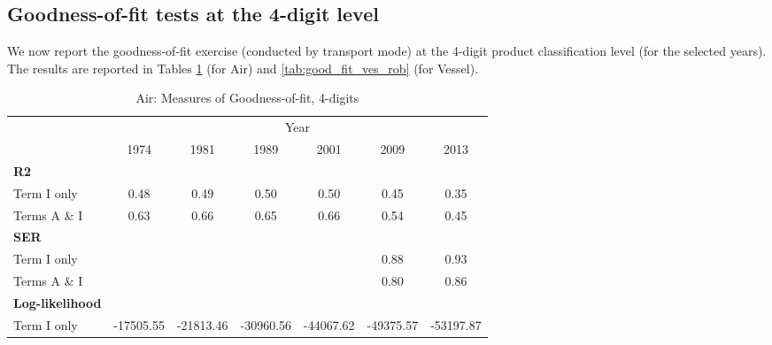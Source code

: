 \documentclass[a4paper,11pt]{article}
\begin{document}
\subsection{Goodness-of-fit tests at the 4-digit level}

We now report the goodness-of-fit exercise (conducted by transport mode) at the 4-digit product classification level (for the selected years). The results are reported in Tables \ref{tab:good_fit_air_rob} (for Air) and \ref{tab:good_fit_ves_rob} (for Vessel).
\begin{table}[htbp]
  \centering
  \caption{Air: Measures of Goodness-of-fit, 4-digits}
\begin{center}
\label{tab:good_fit_air_rob}%
\begin{tabular}{l|cccccc}
\hline
\hline
      & \multicolumn{6}{c}{Year}              \\
      & \multicolumn{1}{c}{1974} & \multicolumn{1}{c}{1981} & \multicolumn{1}{c}{1989} & \multicolumn{1}{c}{2001} & \multicolumn{1}{c}{2009} & \multicolumn{1}{c}{2013}  \\
\hline
\textbf{R2} & \multicolumn{1}{c}{} & \multicolumn{1}{c}{} & \multicolumn{1}{c}{} &       &       &      \\
Term I only & \multicolumn{1}{c}{0.48} & \multicolumn{1}{c}{0.49} & \multicolumn{1}{c}{0.50} & \multicolumn{1}{c}{0.50} & \multicolumn{1}{c}{0.45} & \multicolumn{1}{c}{0.35} \\
Terms A \& I & \multicolumn{1}{c}{0.63} & \multicolumn{1}{c}{0.66} & \multicolumn{1}{c}{0.65} & \multicolumn{1}{c}{0.66} & \multicolumn{1}{c}{0.54} & \multicolumn{1}{c}{0.45} \\
\textbf{SER} & \multicolumn{1}{c}{} & \multicolumn{1}{c}{} & \multicolumn{1}{c}{} &       & \multicolumn{1}{c}{} & \multicolumn{1}{c}{}  \\
Term I only & \multicolumn{1}{c}{} & \multicolumn{1}{c}{} & \multicolumn{1}{c}{} &       & \multicolumn{1}{c}{0.88} & \multicolumn{1}{c}{0.93}  \\
Terms A \& I & \multicolumn{1}{c}{} & \multicolumn{1}{c}{} & \multicolumn{1}{c}{} &       & \multicolumn{1}{c}{0.80} & \multicolumn{1}{c}{0.86}  \\
\textbf{Log-likelihood} & \multicolumn{1}{c}{} & \multicolumn{1}{c}{} & \multicolumn{1}{c}{} &       & \multicolumn{1}{c}{} & \multicolumn{1}{c}{} \\
Term I only & \multicolumn{1}{c}{-17505.55} & \multicolumn{1}{c}{-21813.46} & \multicolumn{1}{c}{-30960.56} & \multicolumn{1}{c}{-44067.62} & \multicolumn{1}{c}{-49375.57} & \multicolumn{1}{c}{-53197.87}  \\

\end{tabular}
\end{center}
\end{table}
\end{document}

